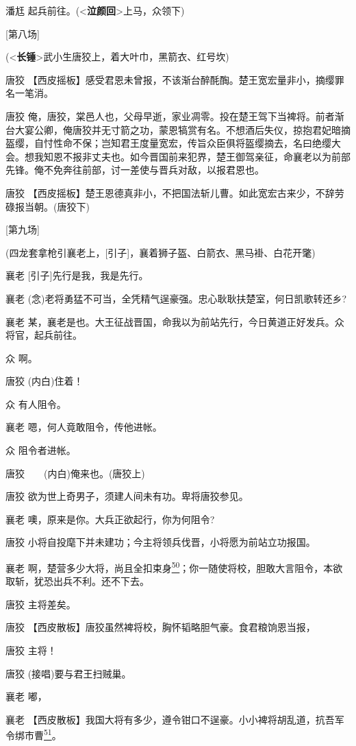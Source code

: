 潘尪 起兵前往。(\textless{}\textbf{泣颜回}\textgreater{}上马，众领下)

{[}第八场{]}

(\textless{}\textbf{长锤}\textgreater{}武小生唐狡上，着大叶巾，黑箭衣、红号坎)

唐狡
【西皮摇板】感受君恩未曾报，不该渐台醉酕醄。楚王宽宏量非小，摘缨罪名一笔消。

唐狡
俺，唐狡，棠邑人也，父母早逝，家业凋零。投在楚王驾下当裨将。前者渐台大宴公卿，俺唐狡并无寸箭之功，蒙恩犒赏有名。不想酒后失仪，掠抱君妃暗摘盔缨，自忖性命不保；岂知君王度量宽宏，传旨众臣俱将盔缨摘去，名曰绝缨大会。想我知恩不报非丈夫也。如今晋国前来犯界，楚王御驾亲征，命襄老以为前部先锋。俺不免奔往前部，讨一差使与晋兵对敌，以报君恩也。

唐狡
【西皮摇板】楚王恩德真非小，不把国法斩儿曹。如此宽宏古来少，不辞劳碌报当朝。(唐狡下)

{[}第九场{]}

(四龙套拿枪引襄老上，{[}引子{]}，襄着狮子盔、白箭衣、黑马褂、白花开氅)

襄老 {[}引子{]}先行是我，我是先行。

襄老 (念)老将勇猛不可当，全凭精气逞豪强。忠心耿耿扶楚室，何日凯歌转还乡?

襄老
某，襄老是也。大王征战晋国，命我以为前站先行，今日黄道正好发兵。众将官，起兵前往。

众 啊。

唐狡 (内白)住着！

众 有人阻令。

襄老 嗯，何人竟敢阻令，传他进帐。

众 阻令者进帐。

唐狡　　(内白)俺来也。(唐狡上)

唐狡 欲为世上奇男子，须建人间未有功。卑将唐狡参见。

襄老 噢，原来是你。大兵正欲起行，你为何阻令?

唐狡 小将自投麾下并未建功；今主将领兵伐晋，小将愿为前站立功报国。

襄老
啊，楚营多少大将，尚且全扣束身\protect\hyperlink{fn50}{\textsuperscript{50}}；你一随使将校，胆敢大言阻令，本欲取斩，犹恐出兵不利。还不下去。

唐狡 主将差矣。

唐狡 【西皮散板】唐狡虽然裨将校，胸怀韬略胆气豪。食君粮饷恩当报，

唐狡 主将！

唐狡 (接唱)要与君王扫贼巢。

襄老 嘟，

襄老
【西皮散板】我国大将有多少，遵令钳口不逞豪。小小裨将胡乱道，抗吾军令绑市曹\protect\hyperlink{fn51}{\textsuperscript{51}}。

